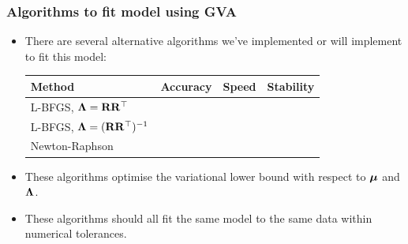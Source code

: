 \documentclass{beamer}
\begin{document}
	\begin{frame}
		\frametitle{Algorithms to fit model using GVA}
		\begin{itemize}
			\item There are several alternative algorithms we've implemented or will implement
			      to fit this model:
			      \begin{tabular}{|l|ccc|}
			      	\hline
			      	Method                                   & Accuracy   & Speed      & Stability  \\
			      	\hline
			      	L-BFGS, ${\boldsymbol \Lambda} = {\bf R} {\bf R}^\top$        & \checkmark &            & \checkmark \\
			      	L-BFGS, ${\boldsymbol \Lambda} = ({\bf R} {\bf R}^\top)^{-1}$ & \checkmark & \checkmark & \checkmark \\
			      	Newton-Raphson                           & \checkmark & \checkmark &            \\
			      	\hline
			      \end{tabular}	
			\item These algorithms optimise the variational lower bound with respect to
			      ${\boldsymbol \mu}$ and ${\boldsymbol \Lambda}$.
			\item These algorithms should all fit the same model to the same data
			      within numerical tolerances.
		\end{itemize}
	\end{frame}
	
\end{document}
